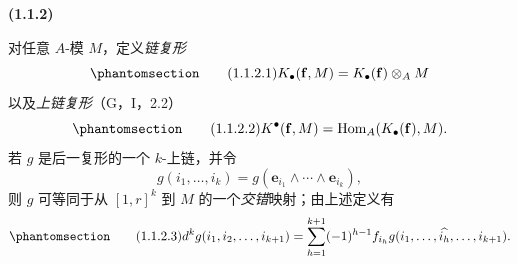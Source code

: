\documentclass[UTF8,fontset=none,11pt,oneside,openany]{ctexbook}
\newenvironment{env}[1][]{%
  \par\medskip\noindent\textbf{(#1)}\ %
}{\par}
\let\EGAOriginalLabel\label
\renewcommand{\label}[1]{\phantomsection\EGAOriginalLabel{#1}}
\begin{document}
\begin{env}[1.1.2]
\label{III.1.1.2-fr}
对任意 $A$-模 $M$，定义\emph{链复形}
\begin{equation}
\label{III.1.1.2.1-fr}
\tag{1.1.2.1}
K_\bullet(\mathbf f,M)=K_\bullet(\mathbf f)\otimes_A M
\end{equation}
以及\emph{上链复形}（G，I，2.2）
\begin{equation}
\label{III.1.1.2.2-fr}
\tag{1.1.2.2}
K^\bullet(\mathbf f,M)=\operatorname{Hom}_A(K_\bullet(\mathbf f),M).
\end{equation}
若 $g$ 是后一复形的一个 $k$-上链，并令
\[
g(i_1,\ldots,i_k)=g(\mathbf e_{i_1}\wedge\cdots\wedge\mathbf e_{i_k}),
\]
则 $g$ 可等同于从 $[1,r]^k$ 到 $M$ 的一个\emph{交错}映射；由上述定义有
\begin{equation}
\label{III.1.1.2.3-fr}
\tag{1.1.2.3}
d^kg(i_1,i_2,\ldots,i_{k+1})=
\sum_{h=1}^{k+1}(-1)^{h-1}f_{i_h}
g(i_1,\ldots,\widehat{i_h},\ldots,i_{k+1}).
\end{equation}
\end{env}
\end{document}
